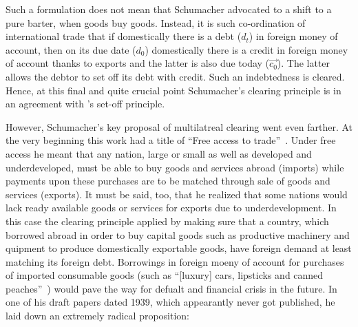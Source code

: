 
Such a formulation does not mean that Schumacher advocated to a shift to a pure barter, when goods buy goods. Instead, it is such co-ordination of international trade that if domestically there is a debt ($d_t$) in foreign money of account, then on its due date ($d_0$) domestically there is a credit in foreign money of account thanks to exports and the latter is also due today ($\overrightarrow{c_0}$). The latter allows the debtor to set off its debt with credit. Such an indebtedness is cleared. Hence, at this final and quite crucial point Schumacher's clearing principle is in an agreement with \citeauthor{innes1913}'s set-off principle.

However, Schumacher's key proposal of multilatreal clearing went even farther. At the very beginning this work had a title of ``Free access to trade''~\citep{schumacher1942_}. Under free access he meant that any nation, large or small as well as developed and underdeveloped, must be able to buy goods and services abroad (imports) while payments upon these purchases are to be matched through sale of goods and services (exports). It must be said, too, that he realized that some nations would lack ready available goods or services for exports due to underdevelopment. In this case the clearing principle applied by making sure that a country, which borrowed abroad in order to buy capital goods such as productive machinery and quipment to produce domestically exportable goods, have foreign demand at least matching its foreign debt. Borrowings in foreign moeny of account for purchases of imported consumable goods (such as ``[luxury] cars, lipsticks and canned peaches''~\citep{schumacher1939}) would pave the way for defualt and financial crisis in the future. In one of his draft papers dated 1939, which appearantly never got published, he laid down an extremely radical proposition:

